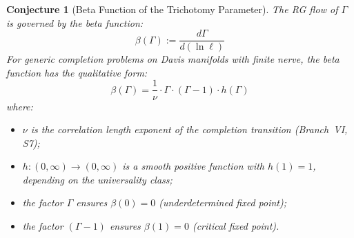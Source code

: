 \documentclass[11pt,letterpaper]{article}
\newtheorem{conjecture}{Conjecture}[section]
\begin{document}
\begin{conjecture}[Beta Function of the Trichotomy 
Parameter]\label{conj:beta}
The RG flow of $\Gamma$ is governed by the beta function:
\begin{equation}\label{eq:beta_def}
    \beta(\Gamma) := \frac{d\Gamma}{d(\ln \ell)}
\end{equation}
For generic completion problems on Davis manifolds with finite 
nerve, the beta function has the qualitative form:
\begin{equation}\label{eq:beta_form}
    \beta(\Gamma) = \frac{1}{\nu} \cdot \Gamma \cdot 
    (\Gamma - 1) \cdot h(\Gamma)
\end{equation}
where:
\begin{itemize}
    \item $\nu$ is the correlation length exponent of the completion 
    transition (Branch~VI, S7);
    \item $h : (0, \infty) \to (0, \infty)$ is a smooth positive 
    function with $h(1) = 1$, depending on the universality class;
    \item the factor $\Gamma$ ensures $\beta(0) = 0$ 
    (underdetermined fixed point);
    \item the factor $(\Gamma - 1)$ ensures $\beta(1) = 0$ 
    (critical fixed point).
\end{itemize}
\end{conjecture}
\end{document}
